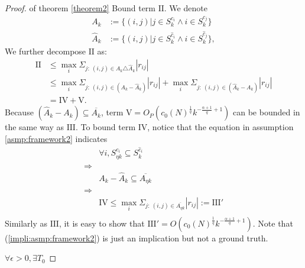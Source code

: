 \begin{proof}{of theorem \ref{theorem2}}
Bound term $\mathrm{II}$. We denote 
\begin{equation}
	\begin{split}
		A_{k} &:= \{ (i,j) | j\in S_{k}^{c_i} \land i \in S_{k}^{c_j} \} \\
        \hat A_k &:= \{ (i,j) | j\in S_{k}^{\hat c_i} \land i \in S_{k}^{\hat c_j} \}, 
	\end{split}
\end{equation}
We further decompose $\mathrm{II}$ as: 
\begin{equation}
	\begin{split}
		\mathrm{II} &\leq \max_i \Sigma_{j:\ (i,j)\in A_k \triangle \hat A_k }       |r_{ij}| \\
        &\leq \max_i \Sigma_{j:\ (i,j) \in (A_k - \hat A_k)} |r_{ij}| + 
        	\max_i \Sigma_{j:\ (i,j) \in (\hat A_k - A_k)} |r_{ij}| \\
        &= \mathrm{IV} + \mathrm{V}.
	\end{split}
    \label{II decompose}
\end{equation}    
Because $(\hat A_k - A_k) \subseteq \overline{A_k}$, term $\mathrm{V} = O_P(c_0(N)^{\frac{1}{q}} k^{-\frac{\alpha+1}{q}+1})$ can be bounded in the same way as $\mathrm{III}$. To bound term $\mathrm{IV}$, notice that the equation in assumption \ref{asmp:framework2} indicates 
\begin{equation}
	\begin{split}
	    & \forall i, S_{\eta k}^{c_i} \subseteq S_{k}^{\hat c_i} \\
        \Rightarrow & \\
        & A_k - \hat A_k \subseteq \overline{ A_{\eta k} }  \\
        \Rightarrow & \\
		& \mathrm{IV} \leq \max_i \Sigma_{j:\ (i,j)\in\overline{A_{\eta k}}} |r_{ij}| := \mathrm{III'}  \\
	\end{split}
 \label{impli:asmp:framework2}
\end{equation} 
Similarly as $\mathrm{III}$, it is easy to show that $\mathrm{III'} = O( c_0(N)^{\frac{1}{q}} k^{-\frac{\alpha+1}{q}+1} ) $. Note that (\ref{impli:asmp:framework2}) is just an implication but not a ground truth. 

$\forall \epsilon>0, \exists T_0$


\end{proof}
